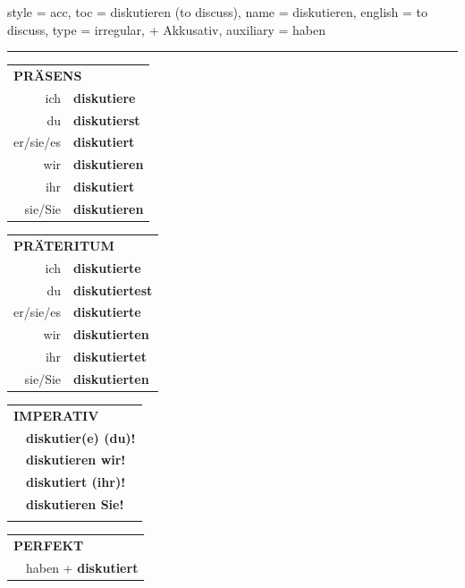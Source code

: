\begin{verbentry}{
  style = {acc},
  toc = {diskutieren (to discuss)},
  name = {diskutieren},
  english = {to discuss},
  type = {irregular, + Akkusativ},
  auxiliary = {haben}
}
 
    
     \vspace{5pt}

    \hrule
    
    \vspace{5pt}

  \begin{tabular}{rl}
     \multicolumn{2}{l}{\textbf{PRÄSENS} }\\
    ich & \textbf{diskutiere}\\
    du & \textbf{diskutierst}\\
    er/sie/es & \textbf{diskutiert}\\
    wir & \textbf{diskutieren}\\
    ihr & \textbf{diskutiert}\\
    sie/Sie & \textbf{diskutieren}\\
  \end{tabular}
  \hfill
     \begin{tabular}{rl}
    \multicolumn{2}{l}{\textbf{PRÄTERITUM} }\\
    ich & \textbf{diskutierte}\\
    du & \textbf{diskutiertest}\\
    er/sie/es & \textbf{diskutierte}\\
    wir & \textbf{diskutierten}\\
    ihr & \textbf{diskutiertet}\\
    sie/Sie & \textbf{diskutierten}\\
  \end{tabular}
  \hfill
  \begin{tabular}{rl}
     \multicolumn{2}{l}{\textbf{IMPERATIV} }\\
   & \textbf{diskutier(e) (du)!}\\
   & \textbf{diskutieren wir!}\\
   & \textbf{diskutiert (ihr)!}\\
   & \textbf{diskutieren Sie!}\\
   & \vspace{10pt}
  \end{tabular}

    \vspace{10pt}

 \begin{tabular}{rl}
     \multicolumn{2}{l}{\textbf{PERFEKT}}\\
  &  haben + \textbf{diskutiert}\\
  \end{tabular}
\hfill
   \begin{tabular}{rl}
   

\end{tabular}
\end{verbentry}

